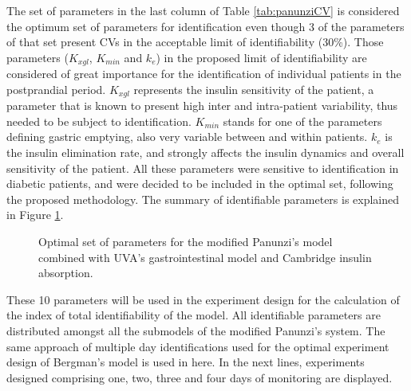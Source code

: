 The set of parameters in the last column of Table \ref{tab:panunziCV} is considered the optimum set of parameters for identification even though 3 of the parameters of that set present CVs in the acceptable limit of identifiability (30\%). Those parameters ($K_{xgl}$, $K_{min}$ and $k_{e}$) in the proposed limit of identifiability are considered of great importance for the identification of individual patients in the postprandial period. $K_{xgl}$ represents the insulin sensitivity of the patient, a parameter that is known to present high inter and intra-patient variability, thus needed to be subject to identification. $K_{min}$ stands for one of the parameters defining gastric emptying, also very variable between and within patients. $k_{e}$ is the insulin elimination rate, and strongly affects the insulin dynamics and overall sensitivity of the patient. All these parameters were sensitive to identification in diabetic patients, and were decided to be included in the optimal set, following the proposed methodology. The summary of identifiable parameters is explained in Figure \ref{fig:panunziparametersidentifiable}.

\begin{figure}[hbtp]
\centering
{}\caption{Optimal set of parameters for the modified Panunzi's model combined with UVA's gastrointestinal model and Cambridge insulin absorption.}
\label{fig:panunziparametersidentifiable}
\end{figure}

These 10 parameters will be used in the experiment design for the calculation of the index of total identifiability of the model. All identifiable parameters are distributed amongst all the submodels of the modified Panunzi's system. The same approach of multiple day identifications used for the optimal experiment design of Bergman's model is used in here. In the next lines, experiments designed comprising one, two, three and four days of monitoring are displayed.

